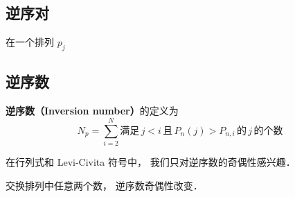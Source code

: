 
\begin{issues}
\issueDraft
\end{issues}


\subsection{逆序对}
在一个排列 $p_{j}$

\subsection{逆序数}
\textbf{逆序数（Inversion number）}的定义为
\begin{equation}\label{InvNum_eq5}
N_p = \sum_{i=2}^N \text{满足}\, j<i \,\text{且}\, P_n(j) > P_{n,i} \, \text{的}\, j\, \text{的个数} 
\end{equation}

在行列式和 Levi-Civita 符号中， 我们只对逆序数的奇偶性感兴趣．

交换排列中任意两个数， 逆序数奇偶性改变． 
